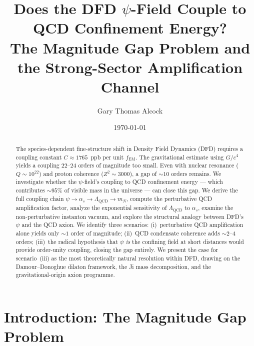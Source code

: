 \documentclass[aps,prd,twocolumn,superscriptaddress,floatfix,nofootinbib]{revtex4-2}
\newcommand{\LQCD}{\Lambda_{\mathrm{QCD}}}
\newcommand{\as}{\alpha_s}
\newcommand{\fEM}{f_{\mathrm{EM}}}
\newcommand{\mN}{m_N}
\begin{document}
\title{Does the DFD $\psi$-Field Couple to QCD Confinement Energy?\\
The Magnitude Gap Problem and the Strong-Sector Amplification Channel}

\author{Gary Thomas Alcock}

\date{\today}

\begin{abstract}
The species-dependent fine-structure shift in Density Field Dynamics (DFD)
requires a coupling constant $C \approx 1765$~ppb per unit $\fEM$. The
gravitational estimate using $G/c^4$ yields a coupling $22$--$24$ orders of
magnitude too small. Even with nuclear resonance ($Q \sim 10^{22}$) and proton
coherence ($Z^2 \sim 3000$), a gap of $\sim 10$ orders remains. We investigate
whether the $\psi$-field's coupling to QCD confinement energy --- which
contributes $\sim 95\%$ of visible mass in the universe --- can close this gap.
We derive the full coupling chain $\psi \to \as \to \LQCD \to \mN$, compute the
perturbative QCD amplification factor, analyze the exponential sensitivity of
$\LQCD$ to $\as$, examine the non-perturbative instanton vacuum, and explore the
structural analogy between DFD's $\psi$ and the QCD axion. We identify three
scenarios: (i)~perturbative QCD amplification alone yields only $\sim 1$ order of
magnitude; (ii)~QCD condensate coherence adds $\sim 2$--$4$ orders; (iii)~the
radical hypothesis that $\psi$ \emph{is} the confining field at short distances
would provide order-unity coupling, closing the gap entirely. We present the
case for scenario~(iii) as the most theoretically natural resolution within DFD,
drawing on the Damour--Donoghue dilaton framework, the Ji mass decomposition,
and the gravitational-origin axion programme.
\end{abstract}

\maketitle

\section{Introduction: The Magnitude Gap Problem}
\label{sec:intro}
\end{document}
